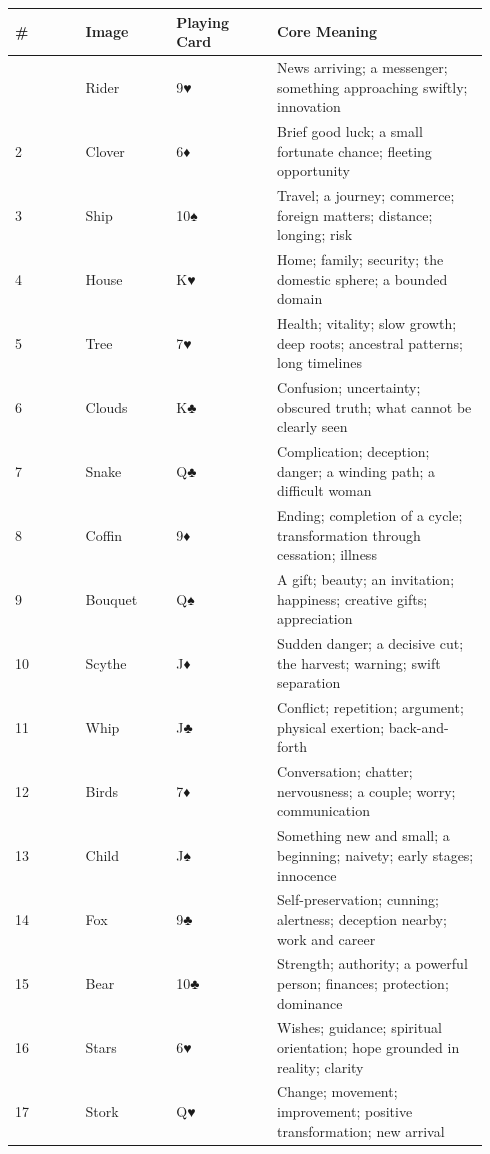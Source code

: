 \begin{longtable}[]{@{}>{\RaggedRight\small}p{0.14\linewidth}>{\RaggedRight\small}p{0.18\linewidth}>{\RaggedRight\small}p{0.20\linewidth}>{\RaggedRight\small}p{0.42\linewidth}@{}}
\toprule\noalign{}
\# & Image & Playing Card & Core Meaning \\
\midrule\noalign{}
\endhead
\bottomrule\noalign{}
\endlastfoot
1 & Rider & 9♥ & News arriving; a messenger; something approaching swiftly; innovation \\
2 & Clover & 6♦ & Brief good luck; a small fortunate chance; fleeting opportunity \\
3 & Ship & 10♠ & Travel; a journey; commerce; foreign matters; distance; longing; risk \\
4 & House & K♥ & Home; family; security; the domestic sphere; a bounded domain \\
5 & Tree & 7♥ & Health; vitality; slow growth; deep roots; ancestral patterns; long timelines \\
6 & Clouds & K♣ & Confusion; uncertainty; obscured truth; what cannot be clearly seen \\
7 & Snake & Q♣ & Complication; deception; danger; a winding path; a difficult woman \\
8 & Coffin & 9♦ & Ending; completion of a cycle; transformation through cessation; illness \\
9 & Bouquet & Q♠ & A gift; beauty; an invitation; happiness; creative gifts; appreciation \\
10 & Scythe & J♦ & Sudden danger; a decisive cut; the harvest; warning; swift separation \\
11 & Whip & J♣ & Conflict; repetition; argument; physical exertion; back-and-forth \\
12 & Birds & 7♦ & Conversation; chatter; nervousness; a couple; worry; communication \\
13 & Child & J♠ & Something new and small; a beginning; naivety; early stages; innocence \\
14 & Fox & 9♣ & Self-preservation; cunning; alertness; deception nearby; work and career \\
15 & Bear & 10♣ & Strength; authority; a powerful person; finances; protection; dominance \\
16 & Stars & 6♥ & Wishes; guidance; spiritual orientation; hope grounded in reality; clarity \\
17 & Stork & Q♥ & Change; movement; improvement; positive transformation; new arrival \\

\end{longtable}
